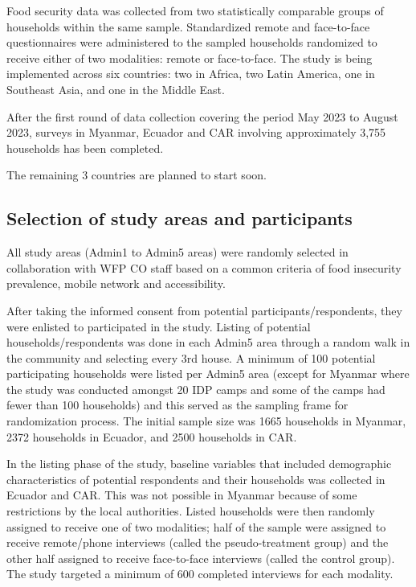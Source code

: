 \documentclass[11pt,harvard]{article}
\begin{document}
Food security data was collected from two statistically comparable groups of households within the same sample. Standardized remote and face-to-face questionnaires were administered to the sampled households randomized to receive either of two modalities: remote or face-to-face. The study is being implemented across six countries: two in Africa, two Latin America, one in Southeast Asia, and one in the Middle East.

After the first round of data collection covering the period May 2023 to August 2023, surveys in Myanmar, Ecuador and CAR involving approximately 3,755 households has been completed. 

The remaining 3 countries are planned to start soon.

\subsection{Selection of study areas and participants}

All study areas (Admin1 to Admin5 areas) were randomly selected in collaboration with WFP CO staff based on a common criteria of food insecurity prevalence, mobile network and accessibility.

After taking the informed consent from potential participants/respondents, they were enlisted to participated in the study. Listing of potential households/respondents was done in each Admin5 area through a random walk in the community and selecting every 3rd house. A minimum of 100 potential participating households were listed per Admin5 area (except for Myanmar where the study was conducted amongst 20 IDP camps and some of the camps had fewer than 100 households) and this served as the sampling frame for randomization process. The initial sample size was 1665 households in Myanmar, 2372 households in Ecuador, and 2500 households in CAR. 

In the listing phase of the study, baseline variables that included demographic characteristics of potential respondents and their households was collected in Ecuador and CAR. This was not possible in Myanmar because of some restrictions by the local authorities. Listed households were then randomly assigned to receive one of two modalities; half of the sample were assigned to receive remote/phone interviews (called the pseudo-treatment group) and the other half assigned to receive face-to-face interviews (called the control group). The study targeted a minimum of 600 completed interviews for each modality.
\end{document}
